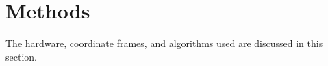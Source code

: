 \section{ Methods }

The hardware, coordinate frames, and algorithms used are discussed in this section.







